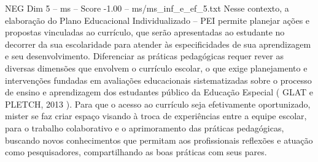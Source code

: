 \begin{textsample}{NEG Dim 5 – ms – Score -1.00 – ms/ms\_inf\_e\_ef\_5.txt}
Nesse contexto, a elaboração do Plano Educacional Individualizado – PEI permite planejar ações e propostas vinculadas ao currículo, que serão apresentadas ao estudante no decorrer da sua escolaridade para atender às especificidades de sua aprendizagem e seu desenvolvimento.
Diferenciar as práticas pedagógicas requer rever as diversas dimensões que envolvem o currículo escolar, o que exige planejamento e intervenções fundadas em avaliações educacionais sistematizadas sobre o processo de ensino e aprendizagem dos estudantes público da Educação Especial ( GLAT e PLETCH, 2013 ).
Para que o acesso ao currículo seja efetivamente oportunizado, mister se faz criar espaço visando à troca de experiências entre a equipe escolar, para o trabalho colaborativo e o aprimoramento das práticas pedagógicas, buscando novos conhecimentos que permitam aos profissionais reflexões e atuação como pesquisadores, compartilhando as boas práticas com seus pares.

\end{textsample}
